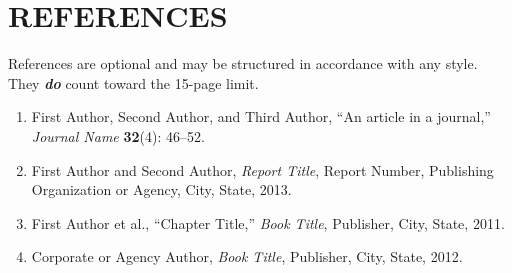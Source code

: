 \documentclass[11pt,letterpaper,english]{article}
\begin{document}
\vspace{-.15in}
\section{REFERENCES}
\vspace{-.15in}

References are optional and may be structured in accordance with any style. They {\bf \em {do}} count toward the 15-page limit.
\vspace{-.15in}
\begin{enumerate}\itemsep0pt
\item First Author, Second Author, and Third Author, ``An article in a journal,'' {\em Journal Name} {\bf 32}(4): 46--52.\\
\item First Author and Second Author, {\em Report Title}, Report Number, Publishing Organization or Agency, City, State, 2013.
\item First Author et al., ``Chapter Title,'' {\em Book Title}, Publisher, City, State, 2011.
\item Corporate or Agency Author, {\em Book Title}, Publisher, City, State, 2012.
\end{enumerate}
\end{document}

